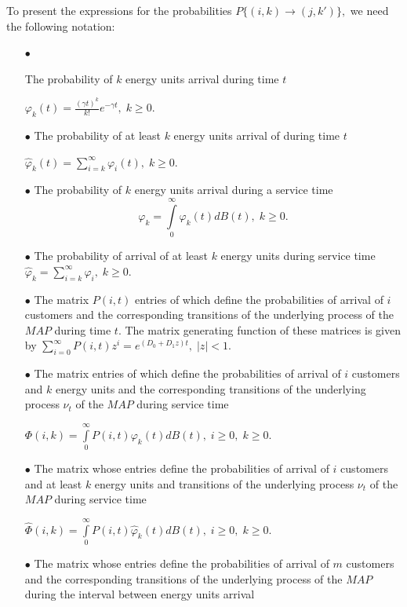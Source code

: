 \documentclass[12pt, a4paper]{article}
\begin{document}
To present the expressions for the probabilities $P\{(i,k) \to (j, k')\},$ we need the following
 notation:
\begin{itemize}
\item[$\bullet$]

The probability of $k$ energy units arrival  during time $t$

$\varphi_{k}(t) = \frac{(\gamma t)^{k} }{k!} e^{-\gamma t},\; k \geq 0$.

\item[$\bullet$]
The probability of at least $k$ energy units arrival of  during time $t$

$ \hat\varphi_{k}(t) = \sum\limits_{i=k}^{\infty} \varphi_{i}(t),\; k \geq 0$.

\item[$\bullet$]
The probability of $k$ energy units arrival  during a service time
$$ \varphi_{k} =   \int\limits_{0}^{\infty}\varphi_{k}(t)dB(t),\; k \geq 0.$$

\item[$\bullet$]
The probability of arrival of at least $k$ energy units during service time
$ \hat\varphi_{k} = \sum\limits_{i=k}^{\infty} \varphi_{i},\; k \geq 0$.

\item[$\bullet$]
The matrix $P(i,t)$ entries of which define the probabilities of arrival of $i$ customers  and the corresponding transitions of the underlying process  of the $MAP$ during time $t.$ The matrix generating function of these matrices is given by
$
\sum\limits_{i=0}^{\infty} P(i,t) z^i = e^{(D_0+D_1z)t},\;|z|<1.$

\item[$\bullet$]
The matrix entries of which define the probabilities of arrival of $i$ customers and  $k$ energy units and the corresponding transitions of the underlying process $\nu_t$ of the $MAP$ during service time

$ \Phi(i,k) =  \int\limits_{0}^{\infty} P(i,t)\varphi_{k}(t)dB(t),\; i \geq 0,\; k \geq 0$.

\item[$\bullet$] The matrix whose entries  define the probabilities of arrival of $i$ customers and at least $k$ energy units and transitions of the underlying process $\nu_t$ of the $MAP$ during service time

$ \hat\Phi(i, k) = \int\limits_{0}^{\infty}  P(i, t) \hat\varphi_{k}(t)dB(t),\; i \geq 0,\; k \geq 0$.

\item[$\bullet$]
The matrix whose entries  define the probabilities of arrival of $m$ customers  and  the corresponding  transitions of the underlying process  of the $MAP$ during  the interval between energy units arrival


\end{itemize}
\end{document}
